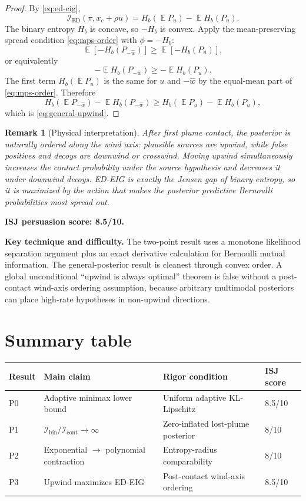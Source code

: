 \documentclass[11pt]{article}
\newtheorem{remark}[theorem]{Remark}
\DeclareMathOperator{\E}{\mathbb{E}}
\newcommand{\Ibin}{\mathcal{I}_{\mathrm{bin}}}
\newcommand{\Icont}{\mathcal{I}_{\mathrm{cont}}}
\newcommand{\IED}{\mathcal{I}_{\mathrm{ED}}}
\begin{document}
\begin{proof}
By \eqref{eq:ed-eig},
\[
        \IED(\pi,x_c+\rho u)
        =
        H_b(\E P_u)-\E H_b(P_u).
\]
The binary entropy $H_b$ is concave, so $-H_b$ is convex.  Apply the mean-preserving spread condition \eqref{eq:mps-order} with $\phi=-H_b$:
\[
        \E[-H_b(P_{-\widehat{w}})]
        \geq
        \E[-H_b(P_u)],
\]
or equivalently
\[
        -\E H_b(P_{-\widehat{w}})
        \geq
        -\E H_b(P_u).
\]
The first term $H_b(\E P_u)$ is the same for $u$ and $-\widehat{w}$ by the equal-mean part of \eqref{eq:mps-order}.  Therefore
\[
        H_b(\E P_{-\widehat{w}})-\E H_b(P_{-\widehat{w}})
        \geq
        H_b(\E P_u)-\E H_b(P_u),
\]
which is \eqref{eq:general-upwind}.
\end{proof}

\begin{remark}[Physical interpretation]
After first plume contact, the posterior is naturally ordered along the wind axis: plausible sources are upwind, while false positives and decoys are downwind or crosswind.  Moving upwind simultaneously increases the contact probability under the source hypothesis and decreases it under downwind decoys.  ED-EIG is exactly the Jensen gap of binary entropy, so it is maximized by the action that makes the posterior predictive Bernoulli probabilities most spread out.
\end{remark}

\noindent\textbf{ISJ persuasion score: 8.5/10.}

\noindent\textbf{Key technique and difficulty.}
The two-point result uses a monotone likelihood separation argument plus an exact derivative calculation for Bernoulli mutual information.  The general-posterior result is cleanest through convex order.  A global unconditional ``upwind is always optimal'' theorem is false without a post-contact wind-axis ordering assumption, because arbitrary multimodal posteriors can place high-rate hypotheses in non-upwind directions.

\section{Summary table}

\begin{center}
\begin{tabular}{llll}
\toprule
Result & Main claim & Rigor condition & ISJ score \\
\midrule
P0 & Adaptive minimax lower bound & Uniform adaptive KL-Lipschitz & 8.5/10 \\
P1 & $\Ibin/\Icont\to\infty$ & Zero-inflated lost-plume posterior & 8/10 \\
P2 & Exponential $\to$ polynomial contraction & Entropy-radius comparability & 8/10 \\
P3 & Upwind maximizes ED-EIG & Post-contact wind-axis ordering & 8.5/10 \\
\bottomrule
\end{tabular}
\end{center}
\end{document}
